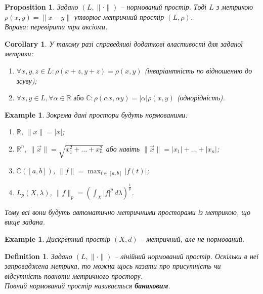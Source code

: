 \documentclass[a4paper, 10pt]{article}
\theoremstyle{theoremdd}
\theoremstyle{theoremdd}
\newtheorem{definition}[theorem]{Definition}
\theoremstyle{theoremdd}
\theoremstyle{theoremdd}
\newtheorem{example}[theorem]{Example}
\theoremstyle{theoremdd}
\newtheorem{proposition}[theorem]{Proposition}
\theoremstyle{theoremdd}
\theoremstyle{theoremdd}
\theoremstyle{theoremdd}
\newtheorem{corollary}[theorem]{Corollary}
\begin{document}
\begin{proposition}
Задано $(L, \| \cdot \|)$ -- нормований простір. Тоді $L$ з метрикою $\rho(x,y) = \|x-y\|$ утворює метричний простір $(L,\rho)$.\\
\textit{Вправа: перевірити три аксіоми.}
\end{proposition}

\begin{corollary}
У такому разі справедливі додаткові властивості для заданої метрики:
\begin{enumerate}[nosep,wide=0pt,label={\arabic*)}]
\item $\forall x,y,z \in L: \rho(x+z,y+z) = \rho(x,y)$ (інваріантність по відношенню до зсуву);
\item $\forall x,y \in L, \forall \alpha \in \mathbb{R} \text{ або } \mathbb{C}: \rho(\alpha x, \alpha y) = |\alpha| \rho(x,y)$ (однорідність).
\end{enumerate}
\end{corollary}

\begin{example}
Зокрема дані простори будуть нормованими:
\begin{enumerate}[nosep,wide=0pt,label={\arabic*)}]
\item $\mathbb{R}$, \qquad $\| x\| = |x|$;
\item $\mathbb{R}^n$, \qquad $\| \vec{x} \| = \sqrt{x_1^2 + \dots + x_n^2}$ або навіть $\| \vec{x} \| = |x_1| + \dots + |x_n|$;
\item $\mathbb{C}([a,b])$, \qquad $\displaystyle \| f\| = \max_{t \in [a,b]} |f(t)|$;
\item $L_p(X,\lambda)$, \qquad $\|f\|_p = \displaystyle\left(\int_X |f|^p\,d\lambda\right)^{\frac{1}{p}}$.
\end{enumerate}
Тому всі вони будуть автоматично метричними просторами із метрикою, що вище задана.
\end{example}

\begin{example}
Дискретний простір $(X,d)$ -- метричний, але не нормований.
\end{example}

\begin{definition}
Задано $(L, \|\cdot\|)$ -- лінійний нормований простір. Оскільки в неї запроваджена метрика, то можна щось казати про присутність чи відсутність повноти метричного простору.\\
Повний нормований простір називається \textbf{банаховим}.
\end{definition}
\end{document}
